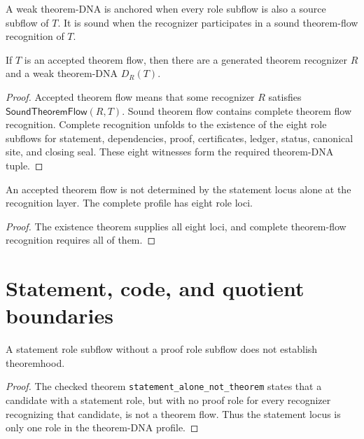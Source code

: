 \begin{definition}
\label{def:anchored-sound-theorem-dna}
A weak theorem-DNA is anchored when every role subflow is also a source
subflow of $T$. It is sound when the recognizer participates in a sound
theorem-flow recognition of $T$.
\end{definition}

\begin{theorem}
\label{thm:accepted-theorem-flows-have-dna}
If $T$ is an accepted theorem flow, then there are a generated theorem
recognizer $R$ and a weak theorem-DNA $D_R(T)$.
\end{theorem}
\begin{proof}
Accepted theorem flow means that some recognizer $R$ satisfies
$\mathsf{SoundTheoremFlow}(R,T)$. Sound theorem flow contains complete theorem
flow recognition. Complete recognition unfolds to the existence of the eight
role subflows for statement, dependencies, proof, certificates, ledger,
status, canonical site, and closing seal. These eight witnesses form the
required theorem-DNA tuple.
\end{proof}

\begin{corollary}
\label{cor:theorem-not-single-locus-object}
An accepted theorem flow is not determined by the statement locus alone at the
recognition layer. The complete profile has eight role loci.
\end{corollary}
\begin{proof}
The existence theorem supplies all eight loci, and complete theorem-flow
recognition requires all of them.
\end{proof}

\section{Statement, code, and quotient boundaries}
\label{sec:theorem-dna-boundaries}

\begin{theorem}
\label{thm:statement-alone-is-not-theorem-dna}
A statement role subflow without a proof role subflow does not establish
theoremhood.
\end{theorem}
\begin{proof}
The checked theorem \texttt{statement\_alone\_not\_theorem} states that a
candidate with a statement role, but with no proof role for every recognizer
recognizing that candidate, is not a theorem flow. Thus the statement locus is
only one role in the theorem-DNA profile.
\end{proof}

